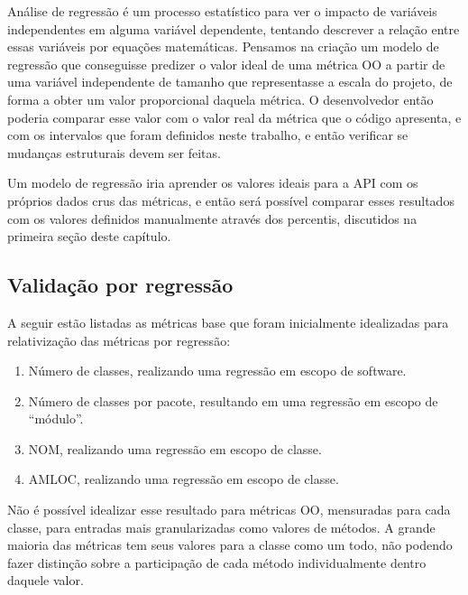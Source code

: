 Análise de regressão é um processo estatístico para ver o impacto de variáveis independentes em alguma variável dependente, tentando descrever a relação entre essas variáveis por equações matemáticas. Pensamos na criação um modelo de regressão que conseguisse predizer o valor ideal de uma métrica OO a partir de uma variável independente de tamanho que representasse a escala do projeto, de forma a obter um valor proporcional daquela métrica. O desenvolvedor então poderia comparar esse valor com o valor real da métrica que o código apresenta, e com os intervalos que foram definidos neste trabalho, e então verificar se mudanças estruturais devem ser feitas.

Um modelo de regressão iria aprender os valores ideais para a API com os próprios dados crus das métricas, e então será possível comparar esses resultados com os valores definidos manualmente através dos percentis, discutidos na primeira seção deste capítulo.



\subsection{Validação por regressão}

A seguir estão listadas as métricas base que foram inicialmente idealizadas para relativização das métricas por regressão:

\begin{enumerate}
\item Número de classes, realizando uma regressão em escopo de software.
\item Número de classes por pacote, resultando em uma regressão em escopo de ``módulo''.
\item NOM, realizando uma regressão em escopo de classe.
\item AMLOC, realizando uma regressão em escopo de classe.
\end{enumerate}

Não é possível idealizar esse resultado para métricas OO, mensuradas para cada classe, para entradas mais granularizadas como valores de métodos. A grande maioria das métricas tem seus valores para a classe como um todo, não podendo fazer distinção sobre a participação de cada método individualmente dentro daquele valor.

